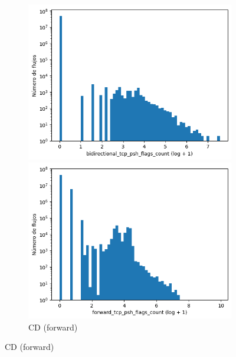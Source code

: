 \begin{figure}[H]
    \centering
    \begin{subfigure}[b]{0.26\textwidth}
        \centering
        \includegraphics[width=\textwidth]{media/packet_pincer_cicddos/bidirectional_tcp_psh_flags_count_log_x_log_y.png}
        \caption{CD (bidir.)}
        \includegraphics[width=\textwidth]{media/packet_pincer_cicddos/forward_tcp_psh_flags_count_log_x_log_y.png}
        \caption{CD (forward)}

\end{subfigure}
\end{figure}
